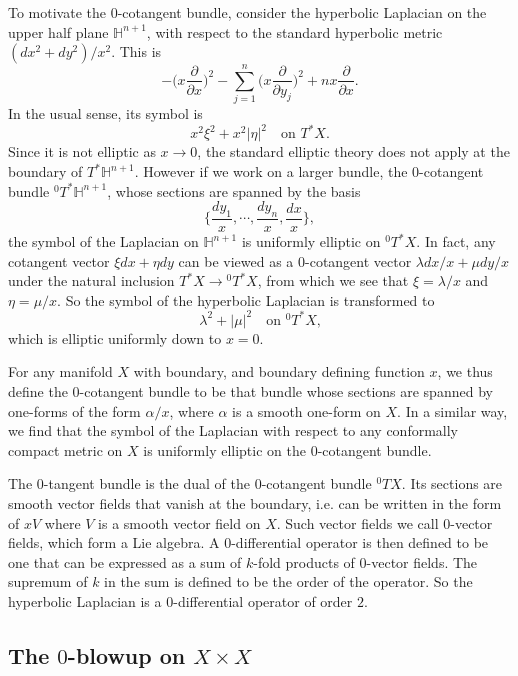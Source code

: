 \documentclass[10pt, a4paper, twoside]{amsart}
\numberwithin{equation}{section}
\theoremstyle{remark}
\begin{document}
To motivate the $0$-cotangent bundle, consider the hyperbolic Laplacian on the upper half plane $\mathbb{H}^{n + 1}$, with respect to the standard hyperbolic metric $(dx^2 + dy^2)/x^2$. This is  $$- \bigg( x\frac{\partial}{\partial x} \bigg)^2 - \sum_{j = 1}^n \bigg( x\frac{\partial}{\partial y_j} \bigg)^2 + n x \frac{\partial}{\partial x}.$$  In the usual sense, its symbol is $$x^2\xi^2 + x^2|\eta|^2 \quad \mbox{on $T^\ast X$.}$$ Since it is not elliptic as $x \rightarrow 0$, the standard elliptic theory does not apply at the boundary of $T^\ast \mathbb{H}^{n + 1} $.
However if we work on a larger bundle, the $0$-cotangent bundle ${}^0T^\ast \mathbb{H}^{n + 1}$, whose sections are spanned by the basis  $$\bigg\{\frac{dy_1}{x}, \cdots, \frac{dy_n}{x}, \frac{dx}{x}\bigg\},$$ the symbol of the Laplacian on $\mathbb{H}^{n + 1}$ is uniformly elliptic on ${}^0 T^\ast X$. In fact, any cotangent vector $\xi dx + \eta dy$ can be viewed as a $0$-cotangent vector $\lambda dx/x + \mu dy/x$ under the natural inclusion $T^\ast X \rightarrow {}^0 T^\ast X$, from which we see that $\xi = \lambda/x$ and $\eta = \mu/x$. So the symbol of the hyperbolic Laplacian is transformed to $$\lambda^2 + |\mu|^2  \quad \mbox{on ${}^0 T^\ast X$,}$$ which is elliptic uniformly down to $x=0$. 

For any manifold $X$ with boundary, and boundary defining function $x$, we thus define the $0$-cotangent bundle to be that bundle whose sections are
spanned by one-forms of the form $\alpha/x$, where $\alpha$ is a smooth one-form on $X$. In a similar way, we find that the symbol of the Laplacian with respect to any conformally compact metric on $X$ is uniformly elliptic on the $0$-cotangent bundle. 

The $0$-tangent bundle is the dual of the $0$-cotangent bundle  ${}^0TX$. Its sections are smooth vector fields that vanish at the boundary, i.e. can be written in the form of $x V$ 
where $V$ is a smooth vector field on $X$. 
Such vector fields we call $0$-vector fields, which form a Lie algebra.  A $0$-differential operator is then defined to be one that can be expressed as a sum of $k$-fold products of $0$-vector fields. The supremum of $k$ in the sum is defined to be the order of the operator. So the hyperbolic Laplacian is a $0$-differential operator of order $2$.

\subsection{The $0$-blowup on $X \times X$}\label{subsec:blowup}
\end{document}
